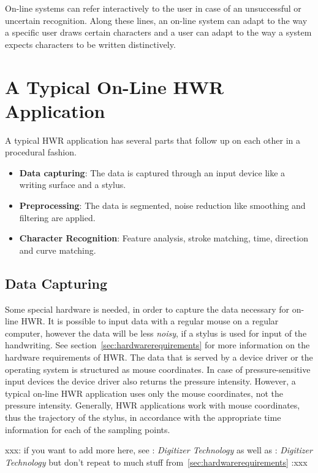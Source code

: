 On-line systems can refer interactively to the user in case of an unsuccessful 
or uncertain recognition. Along these lines, an on-line system can adapt to 
the way a specific user draws certain characters and a user can adapt to the
way a system expects characters to be written distinctively.

\section{A Typical On-Line HWR Application}
\label{sec:atypicalonlinehwrapplication}

A typical HWR application has several parts that follow up on each other in a
procedural fashion.
\begin{itemize}
\item \textbf{Data capturing}: The data is captured through an input device 
  like a writing surface and a stylus.
\item \textbf{Preprocessing}: The data is segmented, noise reduction like smoothing and filtering are applied.
\item \textbf{Character Recognition}: Feature analysis, stroke matching, time, 
direction and curve matching.
\end{itemize}

\subsection{Data Capturing}
\label{sec:datacapturing}

Some special hardware is needed, in order to capture the data necessary 
for on-line HWR. It is possible to input data with a regular mouse on 
a regular computer, however the data will be less \emph{noisy}, 
if a stylus is used for input of the handwriting. 
See section~\ref{sec:hardwarerequirements} for more information on the hardware 
requirements of HWR. The data that is served by a device driver or the operating
system is structured as mouse coordinates. In case of pressure-sensitive input 
devices the device driver also returns the pressure intensity. 
However, a typical on-line HWR application uses only the mouse coordinates,
not the pressure intensity. Generally, HWR applications work with mouse
coordinates, thus the trajectory of the stylus, in accordance with the 
appropriate time information for each of the sampling points.

xxx: 
if you want to add more here, see :
\emph{Digitizer Technology} as well as :
\emph{Digitizer Technology} but don't repeat to much stuff 
from~\ref{sec:hardwarerequirements}
:xxx

